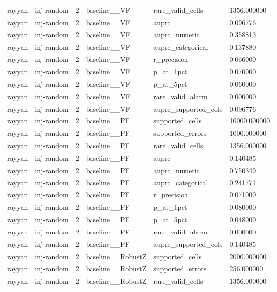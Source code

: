 \begin{tabular}{llllll}
rayyan & inj-random & 2 & baseline\_\_VF & rare\_valid\_cells & 1356.000000 \\
rayyan & inj-random & 2 & baseline\_\_VF & auprc & 0.096776 \\
rayyan & inj-random & 2 & baseline\_\_VF & auprc\_numeric & 0.358813 \\
rayyan & inj-random & 2 & baseline\_\_VF & auprc\_categorical & 0.137880 \\
rayyan & inj-random & 2 & baseline\_\_VF & r\_precision & 0.066000 \\
rayyan & inj-random & 2 & baseline\_\_VF & p\_at\_1pct & 0.070000 \\
rayyan & inj-random & 2 & baseline\_\_VF & p\_at\_5pct & 0.060000 \\
rayyan & inj-random & 2 & baseline\_\_VF & rare\_valid\_alarm & 0.000000 \\
rayyan & inj-random & 2 & baseline\_\_VF & auprc\_supported\_cols & 0.096776 \\
rayyan & inj-random & 2 & baseline\_\_PF & supported\_cells & 10000.000000 \\
rayyan & inj-random & 2 & baseline\_\_PF & supported\_errors & 1000.000000 \\
rayyan & inj-random & 2 & baseline\_\_PF & rare\_valid\_cells & 1356.000000 \\
rayyan & inj-random & 2 & baseline\_\_PF & auprc & 0.140485 \\
rayyan & inj-random & 2 & baseline\_\_PF & auprc\_numeric & 0.750349 \\
rayyan & inj-random & 2 & baseline\_\_PF & auprc\_categorical & 0.241771 \\
rayyan & inj-random & 2 & baseline\_\_PF & r\_precision & 0.071000 \\
rayyan & inj-random & 2 & baseline\_\_PF & p\_at\_1pct & 0.080000 \\
rayyan & inj-random & 2 & baseline\_\_PF & p\_at\_5pct & 0.048000 \\
rayyan & inj-random & 2 & baseline\_\_PF & rare\_valid\_alarm & 0.000000 \\
rayyan & inj-random & 2 & baseline\_\_PF & auprc\_supported\_cols & 0.140485 \\
rayyan & inj-random & 2 & baseline\_\_RobustZ & supported\_cells & 2000.000000 \\
rayyan & inj-random & 2 & baseline\_\_RobustZ & supported\_errors & 256.000000 \\
rayyan & inj-random & 2 & baseline\_\_RobustZ & rare\_valid\_cells & 1356.000000 \\

\end{tabular}

